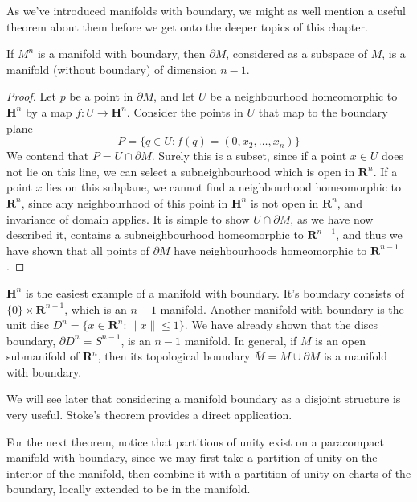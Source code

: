 As we've introduced manifolds with boundary, we might as well mention a useful theorem about them before we get onto the deeper topics of this chapter.

\begin{theorem}
    If $M^n$ is a manifold with boundary, then $\partial M$, considered as a subspace of $M$, is a manifold (without boundary) of dimension $n-1$.
\end{theorem}
\begin{proof}
    Let $p$ be a point in $\partial M$, and let $U$ be a neighbourhood homeomorphic to $\mathbf{H}^n$ by a map $f:U \to \mathbf{H}^n$. Consider the points in $U$ that map to the boundary plane
    \[ P = \{ q \in U : f(q) = (0,x_2, \dots, x_n) \} \]
    We contend that $P = U \cap \partial M$. Surely this is a subset, since if a point $x \in U$ does not lie on this line, we can select a subneighbourhood which is open in $\mathbf{R}^n$. If a point $x$ lies on this subplane, we cannot find a neighbourhood homeomorphic to $\mathbf{R}^n$, since any neighbourhood of this point in $\mathbf{H}^n$ is not open in $\mathbf{R}^n$, and invariance of domain applies. It is simple to show $U \cap \partial M$, as we have now described it, contains a subneighbourhood homeomorphic to $\mathbf{R}^{n-1}$, and thus we have shown that all points of $\partial M$ have neighbourhoods homeomorphic to $\mathbf{R}^{n-1}$.
\end{proof}

\begin{example}
    $\mathbf{H}^n$ is the easiest example of a manifold with boundary. It's boundary consists of $\{ 0 \} \times \mathbf{R}^{n-1}$, which is an $n - 1$ manifold. Another manifold with boundary is the unit disc $D^n = \{ x \in \mathbf{R}^n : \|x\| \leq 1 \}$. We have already shown that the discs boundary, $\partial D^n = S^{n-1}$, is an $n - 1$ manifold. In general, if $M$ is an open submanifold of $\mathbf{R}^n$, then its topological boundary $\overline{M} = M \cup \partial M$ is a manifold with boundary.
\end{example}

We will see later that considering a manifold boundary as a disjoint structure is very useful. Stoke's theorem provides a direct application.










For the next theorem, notice that partitions of unity exist on a paracompact manifold with boundary, since we may first take a partition of unity on the interior of the manifold, then combine it with a partition of unity on charts of the boundary, locally extended to be in the manifold.

